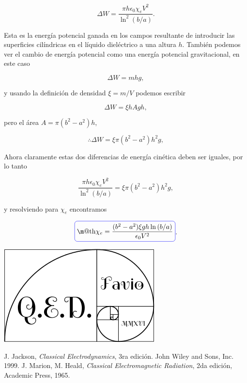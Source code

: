 \documentclass[a4paper,11pt]{article}
\makeatletter
\numberwithin{equation}{section}
\newcommand*{\boxcolor}{blue}
\renewcommand{\boxed}[1]{\textcolor{\boxcolor}{%
\tikz[baseline={([yshift=-1ex]current bounding box.center)}] \node [rectangle, minimum width=1ex,rounded corners,draw] {\normalcolor\m@th$\displaystyle#1$};}}
\makeatother
\begin{document}
\begin{equation}
  \Delta W = \frac{\pi h \epsilon_0 \chi_e V^2}{\ln^2{(b/a)}}.
\end{equation}

Esta es la energía potencial ganada en los campos resultante de introducir las 
superficies cilíndricas en el líquido dieléctrico a una altura $h$. También podemos 
ver el cambio de energía potencial como una energía potencial gravitacional, en 
este caso 

\begin{equation}
 \Delta W = mhg,
\end{equation}

y usando la definición de densidad $\xi = m/V$ podemos escribir 

\begin{equation}
 \Delta W = \xi h A gh,
\end{equation}

pero el área $A = \pi(b^2 - a^2)h$, 

\begin{equation}
 \therefore \Delta W = \xi \pi(b^2 - a^2)h^2 g,
\end{equation}

Ahora claramente estas dos diferencias de energía cinética deben ser iguales, por lo 
tanto 

\begin{equation}
  \frac{\pi h \epsilon_0 \chi_e V^2}{\ln^2{(b/a)}} = \xi \pi(b^2 - a^2)h^2 g,
\end{equation}

y resolviendo para $\chi_e$ encontramos 

\begin{equation}
 \boxed{\chi_e = \frac{(b^2 - a^2)\xi g h \ln{(b/a)}}{\epsilon_0 V^2}}.
\end{equation}

\hspace{10cm}\includegraphics[scale=0.25]{logoQED}

\newpage

\begin{thebibliography}{10}
J. Jackson, \emph{Classical Electrodynamics}, 3ra edición. John Wiley and Sons, Inc. 
1999.
J. Marion, M. Heald, \emph{Classical Electromagnetic Radiation}, 2da edición, Academic 
Press, 1965.
\end{thebibliography}
\end{document}
